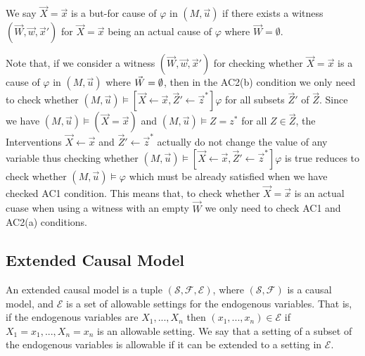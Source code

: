 \begin{definition}
    We say $\vec X = \vec x$ is a but-for cause of $\varphi$ in
    $(M,\vec u)$ if there exists a witness $(\vec W, \vec w, \vec x')$
    for $\vec X = \vec x$ being an actual cause of $\varphi$
    where $\vec W = \emptyset $.
\end{definition}

Note that, if we consider a witness $(\vec W, \vec w, \vec x')$
for checking whether $\vec X = \vec x$ is a cause of $\varphi$
in $(M,\vec u)$ where $\vec W = \emptyset$, then in the AC2(b) condition
we only need to check whether $(M,\vec u) \vDash [\vec X \leftarrow \vec x, \vec Z' \leftarrow \vec z^*]\varphi$ for all subsets $\vec Z'$
of $\vec Z$.
Since we have $(M,\vec u) \vDash (\vec X = \vec x)$ and
$(M,\vec u) \vDash Z = z^*$ for all $Z \in \vec Z$,
the Interventions $\vec X \leftarrow \vec x$ and
$\vec Z ' \leftarrow \vec z^*$ actually do not change the value of
any variable thus checking whether
$(M,\vec u) \vDash [\vec X \leftarrow \vec x, \vec Z' \leftarrow \vec z^*]\varphi$ is true
reduces to check whether $(M,\vec u) \vDash \varphi$
which must be already satisfied when we have checked AC1 condition.
This means that, to check whether $\vec X = \vec x$ is an actual cuase when using a witness with an empty $\vec W$
we only need to check AC1 and AC2(a) conditions.
\subsection{Extended Causal Model}
An extended causal model is a tuple $(\mathcal{S},\mathcal{F},
    \mathcal{E})$, where $(\mathcal{S},\mathcal{F})$ is a causal model, and $\mathcal{E}$ is a set of allowable settings for the endogenous variables.
That is, if the endogenous variables are $X_1,...,X_n$ then
$(x_1,...,x_n) \in \mathcal{E}$ if $X_1 = x_1, ..., X_n=x_n$ is an
allowable setting.
We say that a setting of a subset of the endogenous variables is allowable if it can be extended to a setting in $\mathcal{E}$.